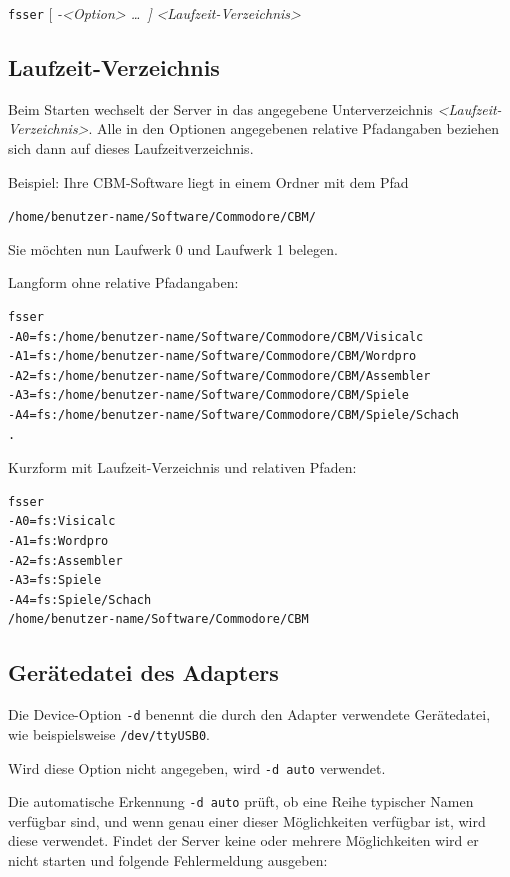 \documentclass[10pt,a4paper]{scrartcl}		%
\begin{document}
\texttt{fsser} \Big[ \textit{-<Option> \ldots \ \Big] }
\textit{<Laufzeit-Verzeichnis>}

\subsection{Laufzeit-Verzeichnis}
Beim Starten wechselt der Server in das angegebene Unterverzeichnis
\textit{<Laufzeit-Verzeichnis>}. Alle in den Optionen angegebenen
relative Pfadangaben beziehen sich dann auf dieses Laufzeitverzeichnis.

Beispiel: Ihre CBM-Software liegt in einem Ordner mit dem Pfad

\texttt{/home/benutzer-name/Software/Commodore/CBM/}

Sie möchten nun Laufwerk 0 und Laufwerk 1 belegen. 

Langform ohne relative Pfadangaben:

\begin{verbatim}
fsser 
-A0=fs:/home/benutzer-name/Software/Commodore/CBM/Visicalc
-A1=fs:/home/benutzer-name/Software/Commodore/CBM/Wordpro
-A2=fs:/home/benutzer-name/Software/Commodore/CBM/Assembler
-A3=fs:/home/benutzer-name/Software/Commodore/CBM/Spiele
-A4=fs:/home/benutzer-name/Software/Commodore/CBM/Spiele/Schach
.
\end{verbatim}

Kurzform mit Laufzeit-Verzeichnis und relativen Pfaden:

\begin{verbatim}
fsser 
-A0=fs:Visicalc
-A1=fs:Wordpro
-A2=fs:Assembler
-A3=fs:Spiele
-A4=fs:Spiele/Schach
/home/benutzer-name/Software/Commodore/CBM
\end{verbatim}

\subsection{Gerätedatei des Adapters}
\mbox{ }

Die Device-Option \texttt{-d} benennt die durch den
Adapter verwendete Gerätedatei, wie beispielsweise
\texttt{/dev/ttyUSB0}.

Wird diese Option nicht angegeben, wird 
\texttt{-d auto} verwendet.

Die automatische Erkennung \texttt{-d auto}
prüft, ob eine Reihe typischer Namen verfügbar sind, und wenn
genau einer dieser Möglichkeiten verfügbar ist, wird
diese verwendet. Findet der Server keine oder mehrere
Möglichkeiten wird er nicht starten und folgende Fehlermeldung
ausgeben:
\end{document}
